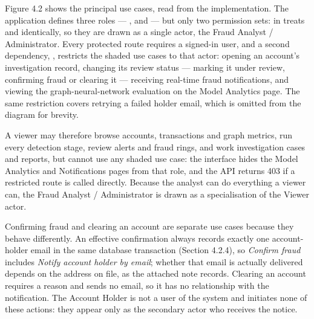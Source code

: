 \documentclass[12pt,a4paper,oneside]{report}
\begin{document}
\pagestyle{empty}

\begin{center}\end{center}
\clearpage

\noindent Figure 4.2 shows the principal use cases, read from the implementation. The application defines three roles --- ,  and  --- but only two permission sets:  in  treats  and  identically, so they are drawn as a single actor, the Fraud Analyst / Administrator. Every protected route requires a signed-in user, and a second dependency, , restricts the shaded use cases to that actor: opening an account's investigation record, changing its review status --- marking it under review, confirming fraud or clearing it --- receiving real-time fraud notifications, and viewing the graph-neural-network evaluation on the Model Analytics page. The same restriction covers retrying a failed holder email, which is omitted from the diagram for brevity.

A viewer may therefore browse accounts, transactions and graph metrics, run every detection stage, review alerts and fraud rings, and work investigation cases and reports, but cannot use any shaded use case: the interface hides the Model Analytics and Notifications pages from that role, and the API returns 403 if a restricted route is called directly. Because the analyst can do everything a viewer can, the Fraud Analyst / Administrator is drawn as a specialisation of the Viewer actor.

Confirming fraud and clearing an account are separate use cases because they behave differently. An effective confirmation always records exactly one account-holder email in the same database transaction (Section 4.2.4), so \textit{Confirm fraud} \guillemotleft include\guillemotright s \textit{Notify account holder by email}; whether that email is actually delivered depends on the address on file, as the attached note records. Clearing an account requires a reason and sends no email, so it has no relationship with the notification. The Account Holder is not a user of the system and initiates none of these actions: they appear only as the secondary actor who receives the notice.
\clearpage
\end{document}
